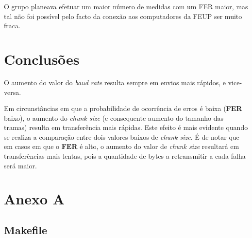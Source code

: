 \documentclass[11pt]{report}
\begin{document}
O grupo planeava efetuar um maior número de medidas com um FER
maior, mas tal não foi possível pelo facto da conexão aos computadores
da FEUP ser muito fraca.

\chapter{Conclusões}

O aumento do valor do \textit{baud rate} resulta sempre em envios mais rápidos,
e vice-versa.

Em circunstâncias em que a probabilidade de ocorrência de erros é baixa
(\textbf{FER} baixo), o aumento do \textit{chunk size} (e consequente aumento
do tamanho das tramas) resulta em transferência mais rápidas. Este efeito é
mais evidente quando se realiza a comparação entre dois valores baixos de
\textit{chunk size}. É de notar que em casos em que o \textbf{FER} é alto,
o aumento do valor de \textit{chunk size} resultará em transferências mais
lentas, pois a quantidade de bytes a retransmitir a cada falha será maior.

\chapter*{Anexo A}

\section{Makefile}
\end{document}
